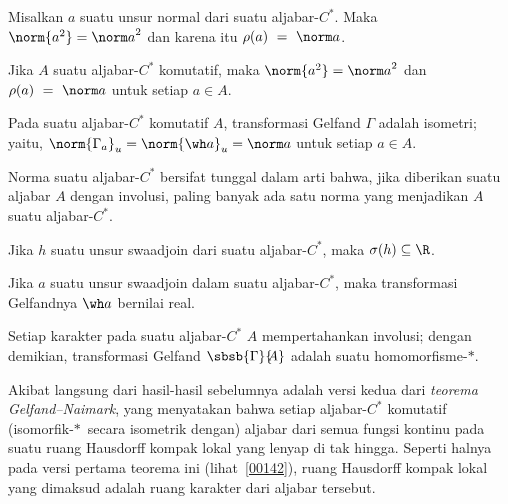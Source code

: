 \begin{prop}\label{00152141} Misalkan $a$ suatu unsur normal dari suatu aljabar-$C^*$. Maka
$\norm{a^2} = {\norm a}^2$ dan karena itu $\rho(a)~=~\norm a$.
\end{prop}

\begin{cor}\label{00152142} Jika $A$ suatu aljabar-$C^*$ komutatif, maka
$\norm{a^2} = {\norm a}^2$ dan $\rho(a)~=~\norm a$ untuk setiap $a \in A$.
\end{cor}

\begin{cor}\label{00152143} Pada suatu aljabar-$C^*$ komutatif $A$, transformasi Gelfand
$\Gamma$ adalah isometri; yaitu, $\norm{\Gamma_a}_u = \norm{\wh a}_u = \norm a$ untuk
setiap $a \in A$.
\end{cor}

\begin{cor}\label{00152144} Norma suatu aljabar-$C^*$ bersifat tunggal dalam arti bahwa, jika
diberikan suatu aljabar $A$ dengan involusi, paling banyak ada satu norma yang menjadikan
$A$ suatu aljabar-$C^*$.
\end{cor}

\begin{prop}\label{00152145} Jika $h$ suatu unsur swaadjoin dari suatu aljabar-$C^*$,
maka $\sigma(h) \subseteq \R$.
\end{prop}

\begin{prop}\label{00152152} Jika $a$ suatu unsur swaadjoin dalam suatu aljabar-$C^*$,
maka transformasi Gelfandnya $\wh a$ bernilai real.
\end{prop}

\begin{prop}\label{00152153} Setiap karakter pada suatu aljabar-$C^*$ $A$ mempertahankan
involusi; dengan demikian, transformasi Gelfand $\sbsb{\Gamma}{\!\!A}$ adalah suatu
homomorfisme-$*$.
\end{prop}

Akibat langsung dari hasil-hasil sebelumnya adalah versi kedua dari
\emph{teorema Gelfand--Naimark}, yang menyatakan bahwa setiap aljabar-$C^*$ komutatif
(isomorfik-$*\,$ secara isometrik dengan) aljabar dari semua fungsi kontinu pada suatu ruang
Hausdorff kompak lokal yang lenyap di tak hingga. Seperti halnya pada versi pertama
teorema ini (lihat~\ref{00142}), ruang Hausdorff kompak lokal yang dimaksud adalah ruang
karakter dari aljabar tersebut.


